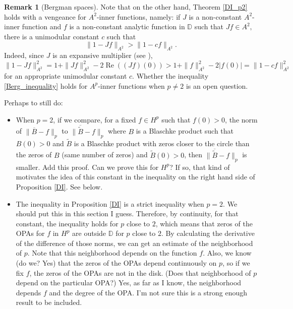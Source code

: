 \documentclass{article}
\theoremstyle{plain}
\numberwithin{Theorem}{section}
\numberwithin{equation}{section}
\theoremstyle{plain}
\theoremstyle{definition}
\newtheorem{Remark}[Theorem]{Remark}
\newcommand{\D}{\mathbb{D}}
\begin{document}
{\begin{Remark}[Bergman spaces]
Note that on the other hand, Theorem \ref{DI_p2} holds with a vengeance for $A^2$-inner functions, namely: if $J$ is a non-constant $A^2$-inner function and $f$ is a non-constant analytic function in $\D$ such that $Jf \in A^2,$ there is a unimodular constant $c$ such that     \begin{equation}\label{Berg_inequality}
    \|1-Jf\|_{A^2} > \|1-cf\|_{A^2}.
    \end{equation}
Indeed, since $J$ is an expansive multiplier (see \cite{DuSchu}), 
\begin{equation*}
    \|1-Jf\|_{A^2}^2 = 1 + \|J f\|_{A^2}^2 - 2\operatorname{Re}((J f) (0)) > 1 + \|f\|_{A^2}^2 - 2|f(0)| = \|1-cf\|_{A^2}^2
\end{equation*}
for an appropriate unimodular constant $c$.
Whether the inequality \eqref{Berg_inequality} holds for $A^p$-inner functions when $p \neq 2$ is an open question. 
\end{Remark}
}
\fi







\iffalse
{\color{Peach} Perhaps to still do:

\begin{itemize}
    \item When $p = 2$, if we compare, for a fixed $f \in H^p$ such that $f(0)>0$, the norm of  $\|\overline{B} - f\|_p$ to $\|\overline{\tilde{B}} - f\|_p$ where $B$ is a Blaschke product such that $B(0) > 0$ and $\tilde{B}$ is a Blaschke product with zeros closer to the circle than the zeros of $B$ (same number of zeros) and $\tilde{B}(0) > 0$, then $\|\overline{\tilde{B}} - f\|_p$ is smaller.  Add this proof.  Can we prove this for $H^p$?  If so, that kind of motivates the idea of this constant in the inequality on the right hand side of Proposition \ref{DI}.  {\color{Emerald} See below.}
    \item The inequality in Proposition \ref{DI} is a strict inequality when $p=2$. We should put this in this section I guess. Therefore, by continuity, for that constant, the inequality holds for $p$ close to $2$, which means that zeros of the OPAs for $f$ in $H^p$ are outside $\D$ for $p$ close to $2$.   By calculating the derivative of the difference of those norms, we can get an estimate of the neighborhood of $p$.  Note that this neighborhood depends on the function $f$.  Also, we know (do we? {\color{Emerald}Yes}) that the zeros of the OPAs depend continuously on $p$, so if we fix $f$, the zeros of the OPAs are not in the  disk.  (Does that neighborhood of $p$ depend on the particular OPA?)  {\color{Emerald} Yes, as far as I know, the neighborhood depends $f$ and the degree of the OPA. I'm not sure this is a strong enough result to be included.}
\end{itemize}

}
\end{document}

